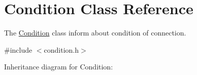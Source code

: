 \hypertarget{classCondition}{}\section{Condition Class Reference}
\label{classCondition}


The \hyperlink{classCondition}{Condition} class inform about condition of connection.  




{\ttfamily \#include $<$condition.\+h$>$}



Inheritance diagram for Condition\+:
